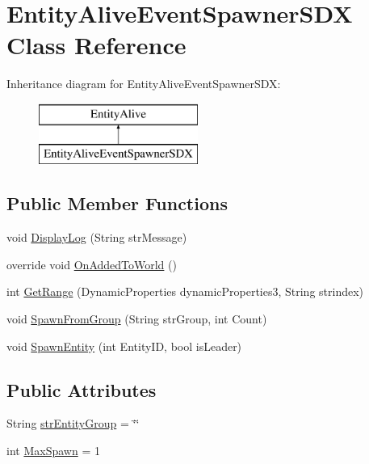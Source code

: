 \hypertarget{class_entity_alive_event_spawner_s_d_x}{}\section{Entity\+Alive\+Event\+Spawner\+S\+DX Class Reference}
\label{class_entity_alive_event_spawner_s_d_x}
Inheritance diagram for Entity\+Alive\+Event\+Spawner\+S\+DX\+:\begin{figure}[H]
\begin{center}
\leavevmode
\includegraphics[height=2.000000cm]{d6/dc8/class_entity_alive_event_spawner_s_d_x}
\end{center}
\end{figure}
\subsection*{Public Member Functions}
\begin{DoxyCompactItemize}
\item 
void \mbox{\hyperlink{class_entity_alive_event_spawner_s_d_x_a20053d6a00c0c2dd83cdcdad3fdbe87b}{Display\+Log}} (String str\+Message)
\item 
override void \mbox{\hyperlink{class_entity_alive_event_spawner_s_d_x_a81514be912db66d9d18dce1214b162e2}{On\+Added\+To\+World}} ()
\item 
int \mbox{\hyperlink{class_entity_alive_event_spawner_s_d_x_a1338080eabbcf5fdd0369097aabe828e}{Get\+Range}} (Dynamic\+Properties dynamic\+Properties3, String strindex)
\item 
void \mbox{\hyperlink{class_entity_alive_event_spawner_s_d_x_a7014f1a45b9a4f2b239fe07f767bc289}{Spawn\+From\+Group}} (String str\+Group, int Count)
\item 
void \mbox{\hyperlink{class_entity_alive_event_spawner_s_d_x_a423f31528771f8cda65bff9d3c76a0b1}{Spawn\+Entity}} (int Entity\+ID, bool is\+Leader)
\end{DoxyCompactItemize}
\subsection*{Public Attributes}
\begin{DoxyCompactItemize}
\item 
String \mbox{\hyperlink{class_entity_alive_event_spawner_s_d_x_aa0c5f7cbfca5d300657cb4b4a45c06bd}{str\+Entity\+Group}} = \char`\"{}\char`\"{}
\item 
int \mbox{\hyperlink{class_entity_alive_event_spawner_s_d_x_ad51ed67c4e3d72c8d056f0a4ded3df1b}{Max\+Spawn}} = 1
\end{DoxyCompactItemize}


